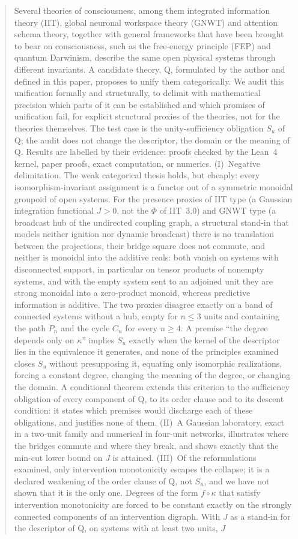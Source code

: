 \documentclass[a4paper,onecolumn,superscriptaddress,10pt,unpublished]{compositionalityarticle}
\begin{document}
\begin{abstract}
Several theories of consciousness, among them integrated information theory (IIT), global neuronal workspace theory (GNWT) and attention schema theory, together with general frameworks that have been brought to bear on consciousness, such as the free-energy principle (FEP) and quantum Darwinism, describe the same open physical systems through different invariants. A candidate theory, Q, formulated by the author and defined in this paper, proposes to unify them categorically. We audit this unification formally and structurally, to delimit with mathematical precision which parts of it can be established and which promises of unification fail, for explicit structural proxies of the theories, not for the theories themselves. The test case is the unity-sufficiency obligation $S_u$ of Q; the audit does not change the descriptor, the domain or the meaning of Q. Results are labelled by their evidence: proofs checked by the Lean~4 kernel, paper proofs, exact computation, or numerics. (I)~Negative delimitation. The weak categorical thesis holds, but cheaply: every isomorphism-invariant assignment is a functor out of a symmetric monoidal groupoid of open systems. For the presence proxies of IIT type (a Gaussian integration functional $J>0$, not the $\Phi$ of IIT~3.0) and GNWT type (a broadcast hub of the undirected coupling graph, a structural stand-in that models neither ignition nor dynamic broadcast) there is no translation between the projections, their bridge square does not commute, and neither is monoidal into the additive reals: both vanish on systems with disconnected support, in particular on tensor products of nonempty systems, and with the empty system sent to an adjoined unit they are strong monoidal into a zero-product monoid, whereas predictive information is additive. The two proxies disagree exactly on a band of connected systems without a hub, empty for $n\le3$ units and containing the path $P_n$ and the cycle $C_n$ for every $n\ge4$. A premise ``the degree depends only on $\kappa$'' implies $S_u$ exactly when the kernel of the descriptor lies in the equivalence it generates, and none of the principles examined closes $S_u$ without presupposing it, equating only isomorphic realizations, forcing a constant degree, changing the meaning of the degree, or changing the domain. A conditional theorem extends this criterion to the sufficiency obligation of every component of Q, to its order clause and to its descent condition: it states which premises would discharge each of these obligations, and justifies none of them. (II)~A Gaussian laboratory, exact in a two-unit family and numerical in four-unit networks, illustrates where the bridges commute and where they break, and shows exactly that the min-cut lower bound on $J$ is attained. (III)~Of the reformulations examined, only intervention monotonicity escapes the collapse; it is a declared weakening of the order clause of Q, not $S_u$, and we have not shown that it is the only one. Degrees of the form $f\circ\kappa$ that satisfy intervention monotonicity are forced to be constant exactly on the strongly connected components of an intervention digraph. With $J$ as a stand-in for the descriptor of Q, on systems with at least two units, $J$ 
\end{abstract}
\end{document}
